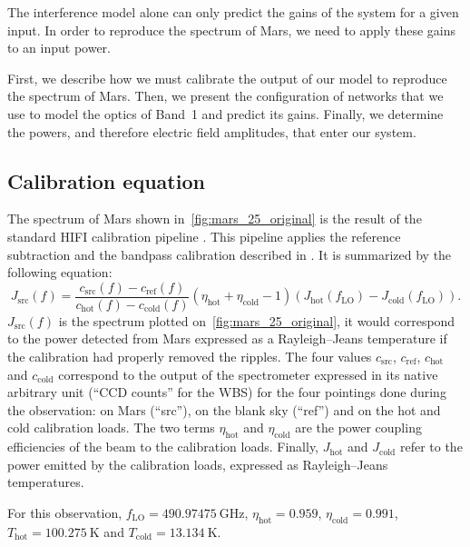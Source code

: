 The interference model alone can only predict the gains of the system for a given input.
In order to reproduce the spectrum of Mars, we need to apply these gains to an input power.


First, we describe how we must calibrate the output of our model to reproduce the spectrum of Mars.
Then, we present the configuration of networks that we use to model the optics of Band~1 and predict its gains.
Finally, we determine the powers, and therefore electric field amplitudes, that enter our system.




\subsection{Calibration equation}

The spectrum of Mars shown in~\cref{fig:mars_25_original} is the result of the standard HIFI calibration pipeline \parencite{hifiobserversmanual}.
This pipeline applies the reference subtraction and the bandpass calibration described in \textcite{ossenkopf2002intensity}.
It is summarized by the following equation:
\begin{equation}
    J_\text{src}(f)%
    = 
    \frac{
        c_\text{src}(f) - c_\text{ref}(f)
    }{
        c_\text{hot}(f) - c_\text{cold}(f)
    }
    (\eta_\text{hot} + \eta_\text{cold} - 1)
    (
        J_\text{hot}(f_\text{LO}) - J_\text{cold}(f_\text{LO})
    )
    \text{.}
    \label{eq:mars_calibration}
\end{equation}
$J_\text{src}(f)$ is the spectrum plotted on~\cref{fig:mars_25_original}, it would correspond to the power detected from Mars expressed as a Rayleigh--Jeans temperature if the calibration had properly removed the ripples.
The four values $c_\text{src}$, $c_\text{ref}$, $c_\text{hot}$ and $c_\text{cold}$ correspond to the output of the spectrometer expressed in its native arbitrary unit (``CCD counts'' for the WBS) for the four pointings done during the observation:
on Mars (``src''), on the blank sky (``ref'') and on the hot and cold calibration loads.
The two terms $\eta_\text{hot}$ and $\eta_\text{cold}$ are the power coupling efficiencies of the beam to the calibration loads.
Finally, $J_\text{hot}$ and $J_\text{cold}$ refer to the power emitted by the calibration loads, expressed as Rayleigh--Jeans temperatures.

For this observation,
$f_\text{LO} = \SI{490.97475}{\giga\hertz}$,
$\eta_\text{hot} = 0.959$,
$\eta_\text{cold} = 0.991$,
$T_\text{hot} = \SI{100.275}{\kelvin}$ and
$T_\text{cold} = \SI{13.134}{\kelvin}$.

